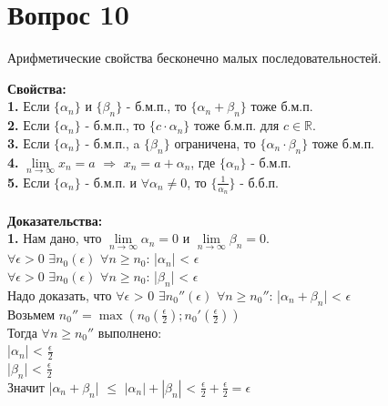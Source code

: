 \documentclass{article}
\DeclareMathOperator{\Exists}{\exists}
\DeclareMathOperator{\Forall}{\forall}
\begin{document}
   
\section*{Вопрос 10}
 
\begin{center}
   {Арифметические свойства бесконечно малых последовательностей.} \\
\end{center}
 
   \textbf{Свойства: }\\
   \textbf{1. }Если $\{ \alpha_n \}$ и $\{ \beta_n \}$ - б.м.п., то $\{ \alpha_n + \beta_n \}$ тоже б.м.п. \\
   \textbf{2. }Если $\{ \alpha_n \}$ - б.м.п., то $\{ c \cdot \alpha_n \}$ тоже б.м.п. для $c \in \mathbb{R}$. \\
   \textbf{3. }Если $\{ \alpha_n \}$ - б.м.п., a $\{\beta_n\}$ ограничена, то $\{ \alpha_n \cdot \beta_n \}$ тоже б.м.п. \\
   \textbf{4. }$\lim\limits_{n \to \infty} {x_n} = a$ $\Rightarrow$ $x_n = a + \alpha_n$, где $\{ \alpha_n \}$ - б.м.п.\\
   \textbf{5. }Если $\{ \alpha_n \}$ - б.м.п. и $\Forall \alpha_n \neq 0$, то $\{ \frac{1}{\alpha_n} \}$ - б.б.п. \\
   \\
   \textbf{Доказательства: }\\
   \textbf{1. }Нам дано, что $\lim\limits_{n \to \infty} {\alpha_n} = 0$ и $\lim\limits_{n \to \infty} {\beta_n} = 0$.\\
   $\Forall \epsilon > 0$ $\Exists n_0(\epsilon)$ $\Forall n \geq n_0$: |$\alpha_n$| < $\epsilon$\\
   $\Forall \epsilon > 0$ $\Exists n_0(\epsilon)$ $\Forall n \geq n_0$: |$\beta_n$| < $\epsilon$\\
   Надо доказать, что $\Forall \epsilon$ > 0 $\Exists n_0''(\epsilon)$ $\Forall n \geq n_0''$: |$\alpha_n + \beta_n$| < $\epsilon$\\
   Возьмем $n_0'' = \max(n_0(\frac{\epsilon}{2}); n_0'(\frac{\epsilon}{2}))$\\
   Тогда $\Forall n \geq n_0''$ выполнено: \\
   |$\alpha_n$| < $\frac{\epsilon}{2}$ \\
   |$\beta_n$| < $\frac{\epsilon}{2}$ \\
   Значит |$\alpha_n + \beta_n$| $\leq$ $|\alpha_n| + |\beta_n|$ < $\frac{\epsilon}{2} + \frac{\epsilon}{2} = \epsilon$\\
\end{document}

